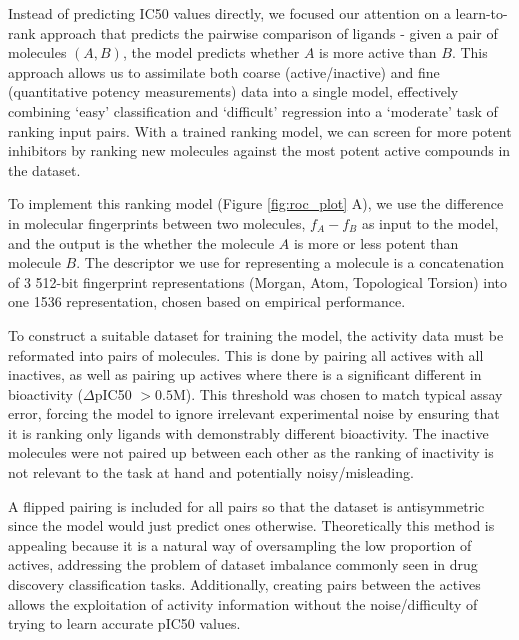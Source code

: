 Instead of predicting IC50 values directly, we focused our attention on a learn-to-rank approach \cite{duffy2010molecular,agarwal2010ranking} that predicts the pairwise comparison of ligands - given a pair of molecules $(A,B)$, the model predicts whether $A$ is more active than $B$. This approach allows us to assimilate both coarse (active/inactive) and fine (quantitative potency measurements) data into a single model, effectively combining `easy' classification and `difficult' regression into a `moderate' task of ranking input pairs. With a trained ranking model, we can screen for more potent inhibitors by ranking new molecules against the most potent active compounds in the dataset.

To implement this ranking model (Figure \ref{fig:roc_plot} A), we use the difference in molecular fingerprints between two molecules, $f_A - f_B$ as input to the model, and the output is the whether the molecule $A$ is more or less potent than molecule $B$. The descriptor we use for representing a molecule is a concatenation of 3 512-bit fingerprint representations (Morgan, Atom, Topological Torsion) into one 1536 representation, chosen based on empirical performance. %

To construct a suitable dataset for training the model, the activity data must be reformated into pairs of molecules. This is done by pairing all actives with all inactives, as well as pairing up actives where there is a significant different in bioactivity ($\Delta$pIC50 $>0.5$M). This threshold was chosen to match typical assay error, forcing the model to ignore irrelevant experimental noise by ensuring that it is ranking only ligands with demonstrably different bioactivity. The inactive molecules were not paired up between each other as the ranking of inactivity is not relevant to the task at hand and potentially noisy/misleading.

A flipped pairing is included for all pairs so that the dataset is antisymmetric since the model would just predict ones otherwise. Theoretically this method is appealing because it is a natural way of oversampling the low proportion of actives, addressing the problem of dataset imbalance commonly seen in drug discovery classification tasks. Additionally, creating pairs between the actives allows the exploitation of activity information without the noise/difficulty of trying to learn accurate pIC50 values.


